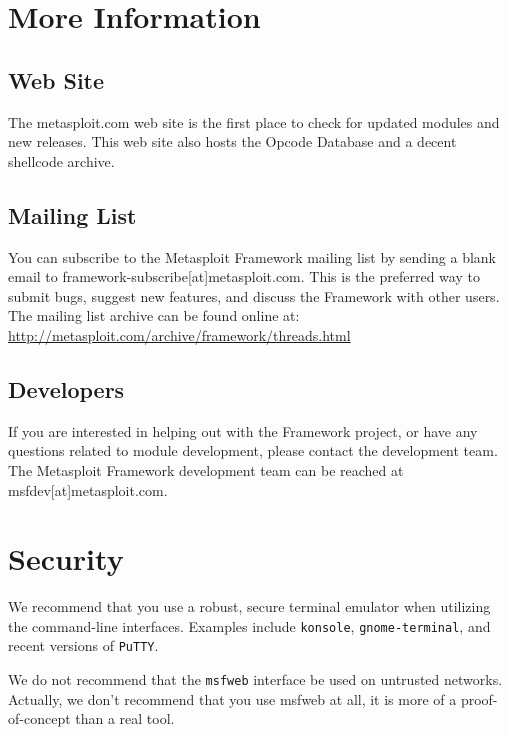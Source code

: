 \documentclass{report}
\begin{document}
\pagebreak
\chapter{More Information}


\section{Web Site}
\par
The metasploit.com web site is the first place to check for updated modules and
new releases. This web site also hosts the Opcode Database and a decent shellcode
archive.  

\section{Mailing List}
\par
You can subscribe to the Metasploit Framework mailing list by sending a blank
email to framework-subscribe[at]metasploit.com. This is the preferred way to
submit bugs, suggest new features, and discuss the Framework with other users.
The mailing list archive can be found online at:
\url{http://metasploit.com/archive/framework/threads.html}

\section{Developers}
\par
If you are interested in helping out with the Framework project, or have any
questions related to module development, please contact the development team. The
Metasploit Framework development team can be reached at msfdev[at]metasploit.com.

\pagebreak
\appendix

\pagebreak
\chapter{Security}

\par
We recommend that you use a robust, secure terminal emulator when
utilizing the command-line interfaces. Examples include \texttt{konsole},
\texttt{gnome-terminal}, and recent versions of \texttt{PuTTY}.

\par
We do not recommend that the \texttt{msfweb} interface be used on untrusted
networks. Actually, we don't recommend that you use msfweb at all, it is
more of a proof-of-concept than a real tool.
\end{document}
